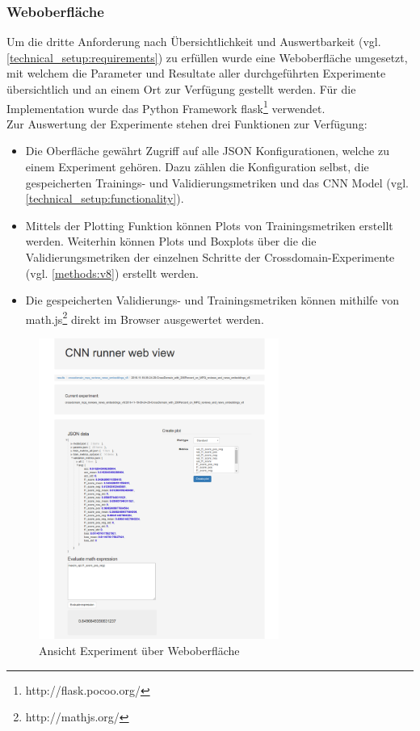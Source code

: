 \subsubsection{Weboberfläche}
\label{technical_setup:webgui}
Um die dritte Anforderung nach Übersichtlichkeit und Auswertbarkeit (vgl. \ref{technical_setup:requirements}) zu erfüllen wurde eine Weboberfläche umgesetzt, mit welchem die Parameter und Resultate aller durchgeführten Experimente übersichtlich und an einem Ort zur Verfügung gestellt werden. Für die Implementation wurde das Python Framework flask\footnote{http://flask.pocoo.org/} verwendet.\\
Zur Auswertung der Experimente stehen drei Funktionen zur Verfügung:
\begin{itemize}
	\item Die Oberfläche gewährt Zugriff auf alle JSON Konfigurationen, welche zu einem Experiment gehören. Dazu zählen die Konfiguration selbst, die gespeicherten Trainings- und Validierungsmetriken und das CNN Model (vgl. \ref{technical_setup:functionality}).
	\item Mittels der Plotting Funktion können Plots von Trainingsmetriken erstellt werden. Weiterhin können Plots und Boxplots über die die Validierungsmetriken der einzelnen Schritte der Crossdomain-Experimente (vgl. \ref{methods:v8}) erstellt werden.
	\item Die gespeicherten Validierungs- und Trainingsmetriken können mithilfe von math.js\footnote{http://mathjs.org/} direkt im Browser ausgewertet werden.
\end{itemize}
\begin{figure}[htbp]
	\centering
	\includegraphics[width=0.7\textwidth]{img/web_gui}
	\caption{Ansicht Experiment über Weboberfläche}
	\label{fig:web_gui}
\end{figure}
